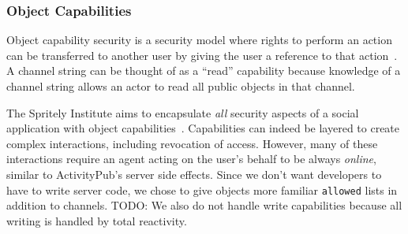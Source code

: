 
\subsubsection{Object Capabilities}
\label{related-work:ocaps}

Object capability security is a security model where rights to perform an action
can be transferred to another user by giving the user a reference to that action~\cite{capabilitymyths}.
A channel string can be thought of as a ``read'' capability because knowledge
of a channel string allows an actor to read all public objects in that channel.

The Spritely Institute aims to encapsulate \emph{all}
security aspects of a social application with object capabilities~\cite{spritely}.
Capabilities can indeed be layered to create complex interactions,
including revocation of access.
However, many of these interactions require an agent acting on the user's behalf
to be always \emph{online}, similar to ActivityPub's server side effects.
Since we don't want developers to have to write server code,
we chose to give objects more familiar \texttt{allowed} lists
in addition to channels.
TODO: We also do not handle write capabilities because all
writing is handled by total reactivity.



